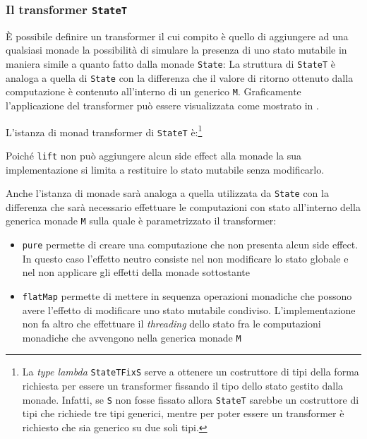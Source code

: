 \subsubsection{Il transformer \lstinline{StateT}}
È possibile definire un transformer il cui compito è quello di aggiungere ad una qualsiasi monade la possibilità di simulare la presenza di uno stato mutabile in maniera simile a quanto fatto dalla monade \lstinline{State}:
La struttura di \lstinline{StateT} è analoga a quella di \lstinline{State} con la differenza che il valore di ritorno ottenuto dalla computazione è contenuto all'interno di un generico \lstinline{M}. Graficamente l'applicazione del transformer può essere visualizzata come mostrato in .



L'istanza di monad transformer di \lstinline{StateT} è:\footnote{La \emph{type lambda} \lstinline{StateTFixS} serve a ottenere un costruttore di tipi della forma richiesta per essere un transformer fissando il tipo dello stato gestito dalla monade. Infatti, se \lstinline{S} non fosse fissato allora \lstinline{StateT} sarebbe un costruttore di tipi che richiede tre tipi generici, mentre per poter essere un transformer è richiesto che sia generico su due soli tipi.}

Poiché \lstinline{lift} non può aggiungere alcun side effect alla monade la sua implementazione si limita a restituire lo stato mutabile senza modificarlo.

Anche l'istanza di monade sarà analoga a quella utilizzata da \lstinline{State} con la differenza che sarà necessario effettuare le computazioni con stato all'interno della generica monade \lstinline{M} sulla quale è parametrizzato il transformer:
\begin{itemize}
  \item \lstinline{pure} permette di creare una computazione che non presenta alcun side effect. In questo caso l'effetto neutro consiste nel non modificare lo stato globale e nel non applicare gli effetti della monade sottostante
  \item \lstinline{flatMap} permette di mettere in sequenza operazioni monadiche che possono avere l'effetto di modificare uno stato mutabile condiviso. L'implementazione non fa altro che effettuare il \emph{threading} dello stato fra le computazioni monadiche che avvengono nella generica monade \lstinline{M}
\end{itemize}


